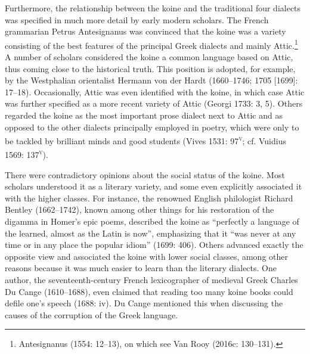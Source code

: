 \begin{styleStandard}
Furthermore, the relationship between the koine and the traditional four dialects was specified in much more detail by early modern scholars. The French grammarian Petrus Antesignanus was convinced that the koine was a variety consisting of the best features of the principal Greek dialects and mainly Attic.\footnote{ Antesignanus (1554: 12–13), on which see Van Rooy (2016c: 130–131).} A number of scholars considered the koine a common language based on Attic, thus coming close to the historical truth. This position is adopted, for example, by the Westphalian orientalist Hermann von der Hardt (1660–1746; 1705 [1699]: 17–18). Occasionally, Attic was even identified with the koine, in which case Attic was further specified as a more recent variety of Attic (Georgi 1733: 3, 5). Others regarded the koine as the most important prose dialect next to Attic and as opposed to the other dialects principally employed in poetry, which were only to be tackled by brilliant minds and good students (Vives 1531: 97\textsc{\textsuperscript{v}}; cf. Vuidius 1569: 137\textsc{\textsuperscript{v}}).
\end{styleStandard}

\begin{styleStandard}
There were contradictory opinions about the social status of the koine. Most scholars understood it as a literary variety, and some even explicitly associated it with the higher classes. For instance, the renowned English philologist Richard Bentley (1662–1742), known among other things for his restoration of the digamma in Homer’s epic poems, described the koine as “perfectly a language of the learned, almost as the Latin is now”, emphasizing that it “was never at any time or in any place the popular idiom” (1699: 406). Others advanced exactly the opposite view and associated the koine with lower social classes, among other reasons because it was much easier to learn than the literary dialects. One author, the seventeenth-century French lexicographer of medieval Greek Charles Du Cange (1610–1688), even claimed that reading too many koine books could defile one’s speech (1688: iv). Du Cange mentioned this when discussing the causes of the corruption of the Greek language.
\end{styleStandard}

